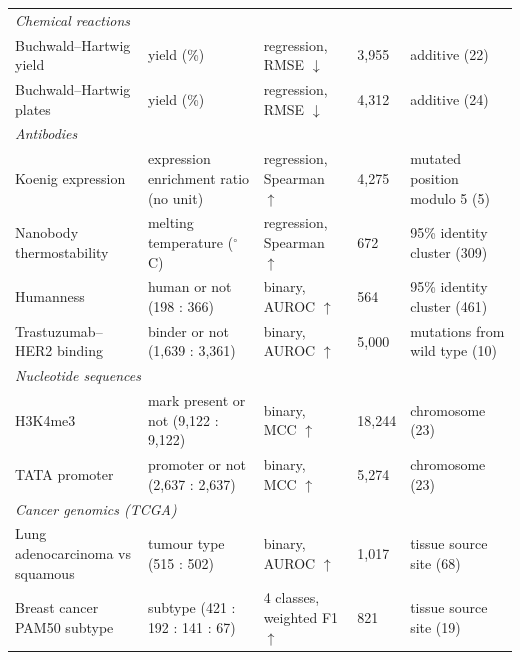\begin{table}[htbp]
\begin{tabular}{p{3.0cm}p{3.3cm}p{2.3cm}p{1.1cm}p{3.5cm}}
\midrule
\multicolumn{5}{l}{\textit{Chemical reactions}} \\
Buchwald--Hartwig yield \citep{Ahneman2018} & yield (\%) & regression, RMSE $\downarrow$ & 3,955 & additive (22) \\
Buchwald--Hartwig plates \citep{Ahneman2018} & yield (\%) & regression, RMSE $\downarrow$ & 4,312 & additive (24) \\
\midrule
\multicolumn{5}{l}{\textit{Antibodies}} \\
Koenig expression \citep{Koenig2017, Chungyoun2024} & expression enrichment ratio (no unit) & regression, Spearman $\uparrow$ & 4,275 & mutated position modulo 5 (5) \\
Nanobody thermostability \citep{ValdesTresanco2023, Chungyoun2024} & melting temperature ($^\circ$C) & regression, Spearman $\uparrow$ & 672 & 95\% identity cluster (309) \\
Humanness \citep{Prihoda2022} & human or not (198 : 366) & binary, AUROC $\uparrow$ & 564 & 95\% identity cluster (461) \\
Trastuzumab--HER2 binding \citep{Chinery2024} & binder or not (1,639 : 3,361) & binary, AUROC $\uparrow$ & 5,000 & mutations from wild type (10) \\
\midrule
\multicolumn{5}{l}{\textit{Nucleotide sequences}} \\
H3K4me3 \citep{DallaTorre2025} & mark present or not (9,122 : 9,122) & binary, MCC $\uparrow$ & 18,244 & chromosome (23) \\
TATA promoter \citep{DallaTorre2025} & promoter or not (2,637 : 2,637) & binary, MCC $\uparrow$ & 5,274 & chromosome (23) \\
\midrule
\multicolumn{5}{l}{\textit{Cancer genomics (TCGA)}} \\
Lung adenocarcinoma vs squamous \citep{TCGA2014LUAD, TCGA2012LUSC, Goldman2020} & tumour type (515 : 502) & binary, AUROC $\uparrow$ & 1,017 & tissue source site (68) \\
Breast cancer PAM50 subtype \citep{TCGA2012BRCA, Parker2009, Goldman2020} & subtype (421 : 192 : 141 : 67) & 4 classes, weighted F1 $\uparrow$ & 821 & tissue source site (19) \\
\bottomrule
\end{tabular}
\end{table}
